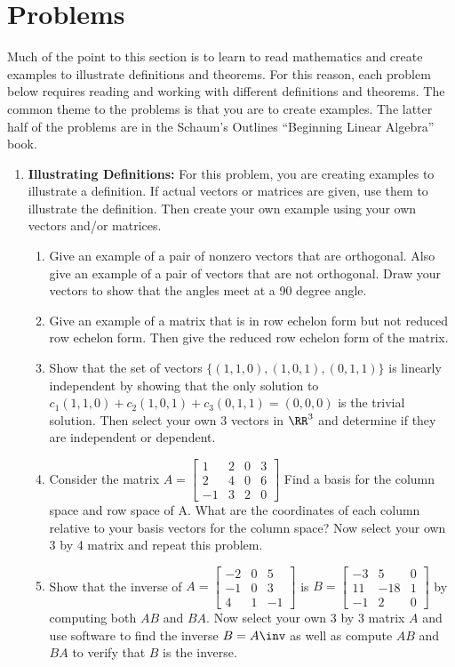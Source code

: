 

\section{Problems}

Much of the point to this section is to learn to read mathematics and create examples to illustrate definitions and theorems.  
For this reason, each problem below requires reading and working with different definitions and theorems. The common theme to the problems is that you are to create examples.  The latter half of the problems are in the Schaum's Outlines  ``Beginning Linear Algebra'' book.


\begin{enumerate}


\item \textbf{Illustrating Definitions:} \label{definition problems}
For this problem, you are creating examples to illustrate a definition. If actual vectors or matrices are given, use them to illustrate the definition. Then create your own example using your own vectors and/or matrices.

\begin{enumerate}
	\item Give an example of a pair of nonzero vectors that are orthogonal. Also give an example of a pair of vectors that are not orthogonal. Draw your vectors to show that the angles meet at a 90 degree angle.
	\item Give an example of a matrix that is in row echelon form but not reduced row echelon form. Then give the reduced row echelon form of the matrix. 
	\item Show that the set of vectors $\{(1,1,0),(1,0,1),(0,1,1)\}$ is linearly independent by showing that the only solution to $c_1(1,1,0)+c_2(1,0,1)+c_3(0,1,1)=(0,0,0)$ is the trivial solution. Then select your own 3 vectors in $\RR^3$ and determine if they are independent or dependent.  
	\item Consider the matrix 
	$A=\begin{bmatrix}
	1 & 2 & 0 & 3 \\
	2 & 4 & 0 & 6 \\
	-1 & 3 & 2 & 0
	\end{bmatrix}$ 
	Find a basis for the column space and row space of A. What are the coordinates of each column relative to your basis vectors for the column space?  Now select your own 3 by 4 matrix and repeat this problem.
	\item Show that the inverse of 
	$A=
\begin{bmatrix}
 -2 & 0 & 5 \\
 -1 & 0 & 3 \\
 4 & 1 & -1
\end{bmatrix}
$
is 
$B=
\begin{bmatrix}
 -3 & 5 & 0 \\
 11 & -18 & 1 \\
 -1 & 2 & 0
\end{bmatrix}
$ by computing both $AB$ and $BA$. Now select your own 3 by 3 matrix
$A$ and use software to find the inverse $B=A\inv$ as well as compute $AB$ and $BA$ to verify that $B$ is the inverse.


\end{enumerate}
\end{enumerate}
